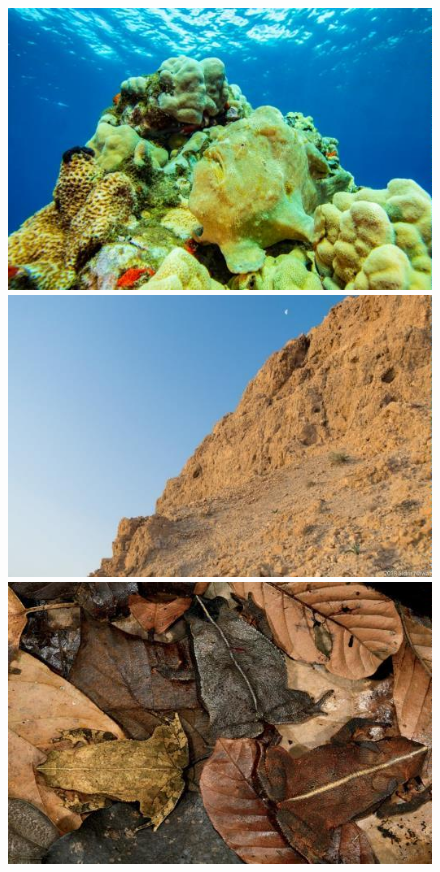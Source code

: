 \documentclass[final]{cvpr}
\begin{document}
\begin{figure}[tp]
{\begin{minipage}[htbp]{.2\textwidth}
        \centering
        \includegraphics[scale=0.25]{COD_Zh_translate/figures/example3.png}
    \end{minipage}
}
\subfigure
{
 	\begin{minipage}[htbp]{.2\textwidth}
        \centering
        \includegraphics[scale=0.25]{COD_Zh_translate/figures/example4.png}
    \end{minipage}
}
\subfigure
{
 	\begin{minipage}[htbp]{.2\textwidth}
        \centering
        \includegraphics[scale=0.25]{COD_Zh_translate/figures/example5.png}

\end{minipage}}
\end{figure}
\end{document}
